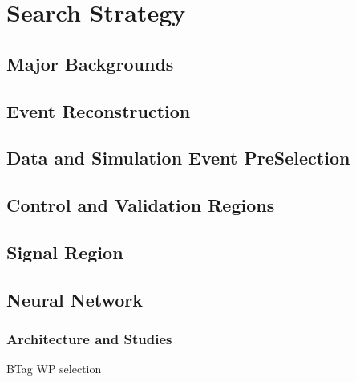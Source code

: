 
\chapter{Search Strategy}
\label{ch:SearchStrategy}
\section{Major Backgrounds}
\section{Event Reconstruction}
\section{Data and Simulation Event PreSelection}
\section{Control and Validation Regions}
\section{Signal Region}
\section{Neural Network}
\label{sec:NN}
\subsection{Architecture and Studies}
BTag WP selection



